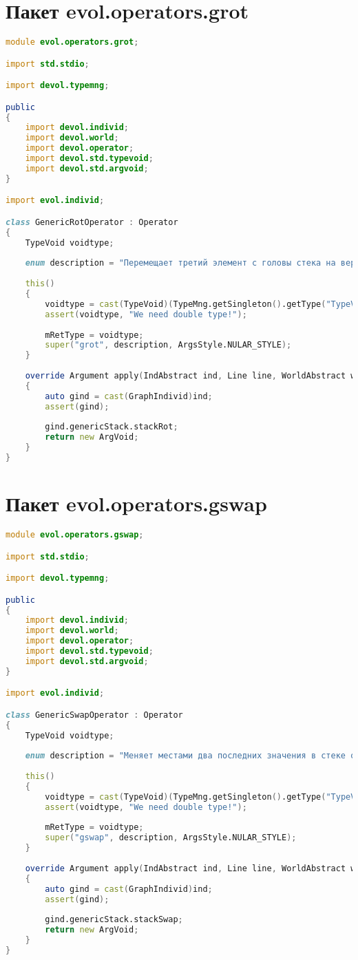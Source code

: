 \documentclass[russian,utf8,emptystyle]{eskdtext}
\begin{document}
\section{Пакет evol.operators.grot}
\begin{lstlisting}[language=D]
module evol.operators.grot;

import std.stdio;

import devol.typemng;

public
{
    import devol.individ;
    import devol.world;
    import devol.operator;
    import devol.std.typevoid;
    import devol.std.argvoid;
}

import evol.individ;

class GenericRotOperator : Operator
{
    TypeVoid voidtype;
    
    enum description = "Перемещает третий элемент с головы стека на вершину. Стек общего назначения.";
    
    this()
    {
        voidtype = cast(TypeVoid)(TypeMng.getSingleton().getType("TypeVoid"));
        assert(voidtype, "We need double type!");
        
        mRetType = voidtype;
        super("grot", description, ArgsStyle.NULAR_STYLE);
    }
    
    override Argument apply(IndAbstract ind, Line line, WorldAbstract world)
    {
        auto gind = cast(GraphIndivid)ind;
        assert(gind);
        
        gind.genericStack.stackRot;
        return new ArgVoid;
    }   
}
\end{lstlisting}


\section{Пакет evol.operators.gswap}
\begin{lstlisting}[language=D]
module evol.operators.gswap;

import std.stdio;

import devol.typemng;

public
{
    import devol.individ;
    import devol.world;
    import devol.operator;
    import devol.std.typevoid;
    import devol.std.argvoid;
}

import evol.individ;

class GenericSwapOperator : Operator
{
    TypeVoid voidtype;
    
    enum description = "Меняет местами два последних значения в стеке общего назначения.";
    
    this()
    {
        voidtype = cast(TypeVoid)(TypeMng.getSingleton().getType("TypeVoid"));
        assert(voidtype, "We need double type!");
        
        mRetType = voidtype;
        super("gswap", description, ArgsStyle.NULAR_STYLE);
    }
    
    override Argument apply(IndAbstract ind, Line line, WorldAbstract world)
    {
        auto gind = cast(GraphIndivid)ind;
        assert(gind);
        
        gind.genericStack.stackSwap;
        return new ArgVoid;
    }   
}
\end{lstlisting}
\end{document}
